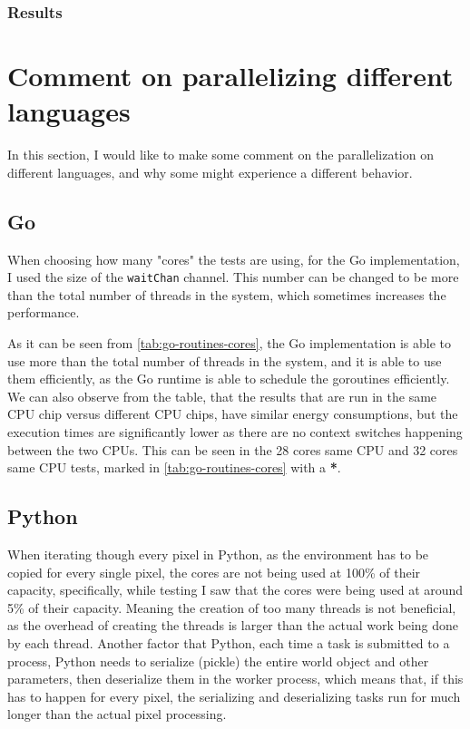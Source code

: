 \subsubsection{Results}


\section{Comment on parallelizing different languages}

In this section, I would like to make some comment on the parallelization on different languages, and why some might experience a different behavior. 

\subsection{Go}
When choosing how many "cores" the tests are using, for the Go implementation, I used the size of the \texttt{waitChan} channel. This number can be changed to be more than the total number of threads in the system, which sometimes increases the performance.



As it can be seen from \autoref{tab:go-routines-cores}, the Go implementation is able to use more than the total number of threads in the system, and it is able to use them efficiently, as the Go runtime is able to schedule the goroutines efficiently. We can also observe from the table, that the results that are run in the same CPU chip versus different CPU chips, have similar energy consumptions, but the execution times are significantly lower as there are no context switches happening between the two CPUs. This can be seen in the 28 cores same CPU and 32 cores same CPU tests, marked in \autoref{tab:go-routines-cores} with a \textbf{*}.

\subsection{Python}
When iterating though every pixel in Python, as the environment has to be copied for every single pixel, the cores are not being used at 100\% of their capacity, specifically, while testing I saw that the cores were being used at around 5\% of their capacity. Meaning the creation of too many threads is not beneficial, as the overhead of creating the threads is larger than the actual work being done by each thread. 
Another factor that Python, each time a task is submitted to a process, Python needs to serialize (pickle) the entire world object and other parameters, then deserialize them in the worker process, which means that, if this has to happen for every pixel, the serializing and deserializing tasks run for much longer than the actual pixel processing.

